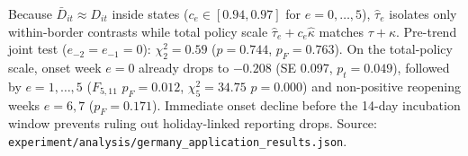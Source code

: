 \begin{table}[!t]
\par\smallskip\parbox{\linewidth}{\scriptsize Because $\bar D_{it}\approx D_{it}$ inside states ($c_e \in [0.94, 0.97]$ for $e=0,\dots,5$), $\hat\tau_e$ isolates only within-border contrasts while total policy scale $\hat\tau_e + c_e\hat\kappa$ matches $\tau+\kappa$. Pre-trend joint test ($e_{-2}=e_{-1}=0$): $\chi^2_2 = 0.59$ ($p=0.744$, $p_F=0.763$). On the total-policy scale, onset week $e=0$ already drops to $-0.208$ (SE 0.097, $p_t=0.049$), followed by $e=1,\dots,5$ ($F_{5,11}$ $p_F=0.012$, $\chi^2_5=34.75$ $p=0.000$) and non-positive reopening weeks $e=6,7$ ($p_F=0.171$). Immediate onset decline before the 14-day incubation window prevents ruling out holiday-linked reporting drops. Source: \texttt{experiment/analysis/germany\_application\_results.json}.}
\end{table}
